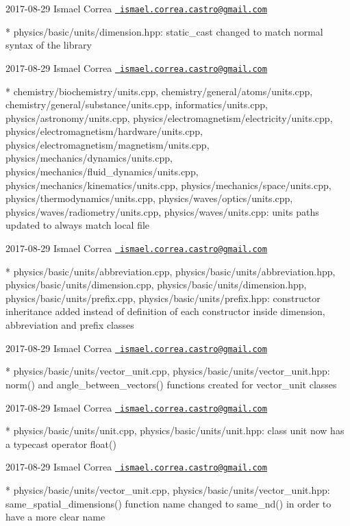  2017-\/08-\/29 Ismael Correa \href{mailto:ismael.correa.castro@gmail.com}{\texttt{ ismael.\+correa.\+castro@gmail.\+com}} \begin{DoxyVerb}* physics/basic/units/dimension.hpp: static_cast changed to match
normal syntax of the library
\end{DoxyVerb}
 2017-\/08-\/29 Ismael Correa \href{mailto:ismael.correa.castro@gmail.com}{\texttt{ ismael.\+correa.\+castro@gmail.\+com}} \begin{DoxyVerb}* chemistry/biochemistry/units.cpp,
chemistry/general/atoms/units.cpp,
chemistry/general/substance/units.cpp, informatics/units.cpp,
physics/astronomy/units.cpp,
physics/electromagnetism/electricity/units.cpp,
physics/electromagnetism/hardware/units.cpp,
physics/electromagnetism/magnetism/units.cpp,
physics/mechanics/dynamics/units.cpp,
physics/mechanics/fluid_dynamics/units.cpp,
physics/mechanics/kinematics/units.cpp,
physics/mechanics/space/units.cpp,
physics/thermodynamics/units.cpp, physics/waves/optics/units.cpp,
physics/waves/radiometry/units.cpp, physics/waves/units.cpp: units
paths updated to always match local file
\end{DoxyVerb}
 2017-\/08-\/29 Ismael Correa \href{mailto:ismael.correa.castro@gmail.com}{\texttt{ ismael.\+correa.\+castro@gmail.\+com}} \begin{DoxyVerb}* physics/basic/units/abbreviation.cpp,
physics/basic/units/abbreviation.hpp,
physics/basic/units/dimension.cpp,
physics/basic/units/dimension.hpp, physics/basic/units/prefix.cpp,
physics/basic/units/prefix.hpp: constructor inheritance added
instead of definition of each constructor inside dimension,
abbreviation and prefix classes
\end{DoxyVerb}
 2017-\/08-\/29 Ismael Correa \href{mailto:ismael.correa.castro@gmail.com}{\texttt{ ismael.\+correa.\+castro@gmail.\+com}} \begin{DoxyVerb}* physics/basic/units/vector_unit.cpp,
physics/basic/units/vector_unit.hpp: norm() and
angle_between_vectors() functions created for vector_unit classes
\end{DoxyVerb}
 2017-\/08-\/29 Ismael Correa \href{mailto:ismael.correa.castro@gmail.com}{\texttt{ ismael.\+correa.\+castro@gmail.\+com}} \begin{DoxyVerb}* physics/basic/units/unit.cpp, physics/basic/units/unit.hpp: class
unit now has a typecast operator float()
\end{DoxyVerb}
 2017-\/08-\/29 Ismael Correa \href{mailto:ismael.correa.castro@gmail.com}{\texttt{ ismael.\+correa.\+castro@gmail.\+com}} \begin{DoxyVerb}* physics/basic/units/vector_unit.cpp,
physics/basic/units/vector_unit.hpp: same_spatial_dimensions()
function name changed to same_nd() in order to have a more clear
name
\end{DoxyVerb}
